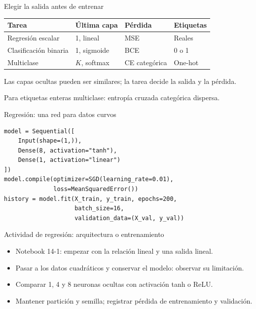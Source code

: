 \documentclass[10pt,aspectratio=169,xcolor={dvipsnames}]{beamer}
\begin{document}
\begin{frame}{Elegir la salida antes de entrenar}
\centering\small
\begin{tabular}{llll}\toprule
Tarea & Última capa & Pérdida & Etiquetas\\\midrule
Regresión escalar & 1, lineal & MSE & Reales\\
Clasificación binaria & 1, sigmoide & BCE & 0 o 1\\
Multiclase & $K$, softmax & CE categórica & One-hot\\\bottomrule
\end{tabular}\par\bigskip\raggedright
Las capas ocultas pueden ser similares; la tarea decide la salida y la pérdida.
\par\medskip Para etiquetas enteras multiclase: entropía cruzada categórica dispersa.
\note{}
\end{frame}

\begin{frame}[fragile]{Regresión: una red para datos curvos}
\begin{lstlisting}
model = Sequential([
    Input(shape=(1,)),
    Dense(8, activation="tanh"),
    Dense(1, activation="linear")
])
model.compile(optimizer=SGD(learning_rate=0.01),
              loss=MeanSquaredError())
history = model.fit(X_train, y_train, epochs=200,
                    batch_size=16,
                    validation_data=(X_val, y_val))
\end{lstlisting}

\end{frame}

\begin{frame}{Actividad de regresión: arquitectura o entrenamiento}
\begin{itemize}
\item Notebook 14-1: empezar con la relación lineal y una salida lineal.
\item Pasar a los datos cuadráticos y conservar el modelo: observar su limitación.
\item Comparar 1, 4 y 8 neuronas ocultas con activación tanh o ReLU.
\item Mantener partición y semilla; registrar pérdida de entrenamiento y validación.
\end{itemize}
\end{frame}
\end{document}
